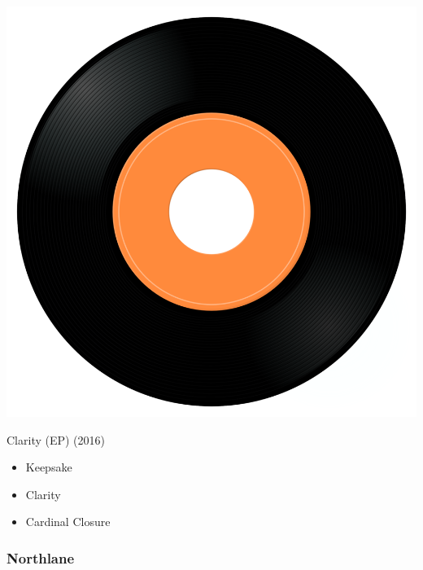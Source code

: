 \begin{minipage}[t]{0.25\textwidth}
\captionsetup{type=figure}
\includegraphics[width=\textwidth]{Images/cover.png}
\caption*{Clarity (EP) (2016)}
\end{minipage}
\begin{minipage}[t]{0.25\textwidth}\vspace{0pt}
\begin{itemize}[nosep,leftmargin=1em,labelwidth=*,align=left]
	\setlength{\itemsep}{0pt}
	\item Keepsake 
	\item Clarity
	\item Cardinal Closure
\end{itemize}
\end{minipage}

\subsubsection{Northlane}

